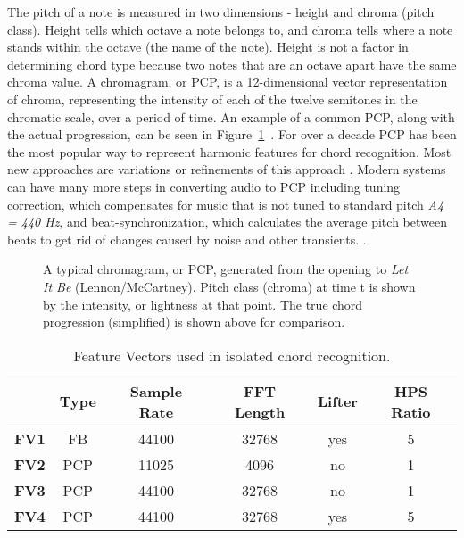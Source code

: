 \documentclass{sig-alternate}
\begin{document}
The pitch of a note is measured in two dimensions - height and chroma (pitch class). Height tells which octave a note belongs to, and chroma tells where a note stands within the octave (the name of the note). Height is not a factor in determining chord type because two notes that are an octave apart have the same chroma value. A chromagram, or PCP, is a 12-dimensional vector representation of chroma, representing the intensity of each of the twelve semitones in the chromatic scale, over a period of time. An example of a common PCP, along with the actual progression, can be seen in Figure~\ref{fig:fig4}~\cite{McVicar:2014}. For over a decade PCP has been the most popular way to represent harmonic features for chord recognition. Most new approaches are variations or refinements of this approach \cite{TaeMin:2014}. Modern systems can have many more steps in converting audio to PCP including tuning correction, which compensates for music that is not tuned to standard pitch \textit{A4 = 440 Hz}, and beat-synchronization, which calculates the average pitch between beats to get rid of changes caused by noise and other transients. \cite{McVicar:2014}.


\begin{figure}
\centering
{}
\caption{A typical chromagram, or PCP, generated from the opening to \textit{Let It Be} (Lennon/McCartney). Pitch class (chroma) at time t is shown by the intensity, or lightness at that point. The true chord progression (simplified) is shown above for comparison.}
\label{fig:fig4}
\end{figure}

\begin{table*}
\centering
\begin{tabular}{|c|c|c|c|c|c|} \hline
 & \textbf{Type} & \textbf{Sample Rate} & \textbf{FFT Length} & \textbf{Lifter} & \textbf{HPS Ratio} \\ \hline
\textbf{FV1} & FB & 44100 & 32768 & yes & 5 \\ \hline
\textbf{FV2} & PCP & 11025 & 4096 & no & 1 \\ \hline
\textbf{FV3} & PCP & 44100 & 32768 & no & 1 \\ \hline
\textbf{FV4} & PCP & 44100 & 32768 & yes & 5 \\ \hline
\end{tabular}
\caption{Feature Vectors used in isolated chord recognition.}
\label{tab:tab2}
\end{table*} 
\end{document}
